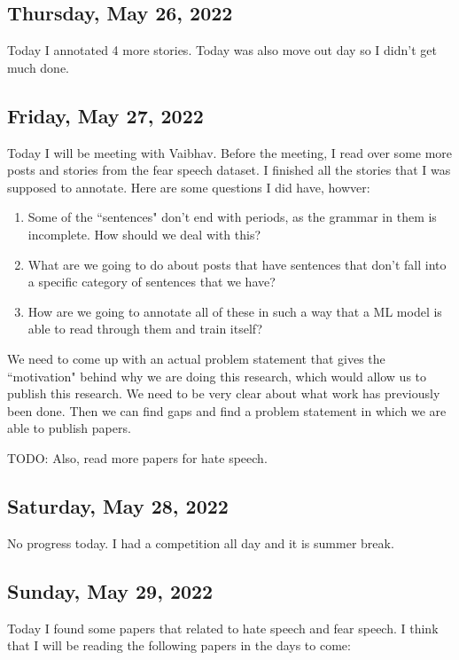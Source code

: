 \documentclass[11pt,letterpaper]{article}
\begin{document}
\subsection{Thursday, May 26, 2022}
Today I annotated 4 more stories. Today was also move out day so I didn't get much done.

\subsection{Friday, May 27, 2022}
Today I will be meeting with Vaibhav. Before the meeting, I read over some more posts and stories from the fear speech dataset. I finished all the stories that I was supposed to annotate. Here are some questions I did have, howver:

\begin{enumerate}
    \item Some of the ``sentences" don't end with periods, as the grammar in them is incomplete. How should we deal with this?
    \item What are we going to do about posts that have sentences that don't fall into a specific category of sentences that we have?
    \item How are we going to annotate all of these in such a way that a ML model is able to read through them and train itself?
\end{enumerate}

We need to come up with an actual problem statement that gives the ``motivation" behind why we are doing this research, which would allow us to publish this research. We need to be very clear about what work has previously been done. Then we can find gaps and find a problem statement in which we are able to publish papers.

TODO: Also, read more papers for hate speech.

\subsection{Saturday, May 28, 2022}
No progress today. I had a competition all day and it is summer break.

\subsection{Sunday, May 29, 2022}
Today I found some papers that related to hate speech and fear speech. I think that I will be reading the following papers in the days to come:
\end{document}
